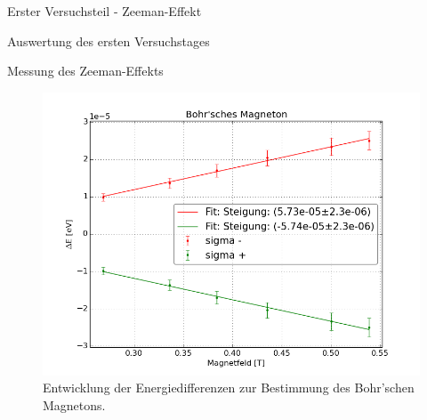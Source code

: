 \documentclass[pdftex, a4paper,11pt, twoside, ngerman]{report}
\begin{document}
\begin{chapter}{Erster Versuchsteil - Zeeman-Effekt}
\begin{section}{Auswertung des ersten Versuchstages}
\begin{subsection}{Messung des Zeeman-Effekts}
\begin{figure}[ht]
          \includegraphics[width=\textwidth]
              {Figures/BohrschesMagneton_Magnetfeld_dE.png}
          \caption{Entwicklung der Energiedifferenzen zur Bestimmung des
              Bohr'schen Magnetons.}
          \label{fig:BohrschesMagneton}
        \end{figure}
        
      \end{subsection}
      
      
      

\end{section}
\end{chapter}
\end{document}
